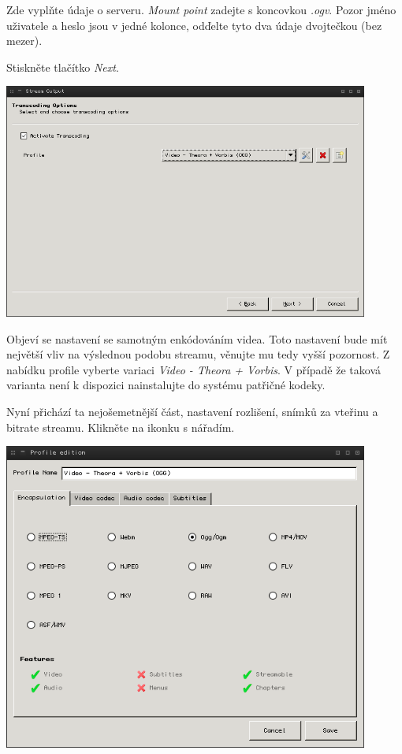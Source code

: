 \documentclass[11pt]{article} %
\begin{document}
Zde vyplňte údaje o serveru. {\em Mount point} zadejte s koncovkou {\em *.ogv}. Pozor jméno uživatele a heslo jsou v jedné kolonce, odďelte tyto dva údaje dvojtečkou (bez mezer).

Stiskněte tlačítko {\em Next}.


\begin{center}
\includegraphics[width=0.9\textwidth]{7}
\end{center}

Objeví se nastavení se samotným enkódováním videa. Toto nastavení bude mít největší vliv na výslednou podobu streamu, věnujte mu tedy vyšší pozornost. Z nabídku profile vyberte variaci {\em Video - Theora + Vorbis}. V případě že taková varianta není k dispozici nainstalujte do systému patřičné kodeky.

Nyní přichází ta nejošemetnější část, nastavení rozlišení, snímků za vteřinu a bitrate streamu. Klikněte na ikonku s nářadím.


\begin{center}
\includegraphics[width=0.9\textwidth]{8}
\end{center}
\end{document}
